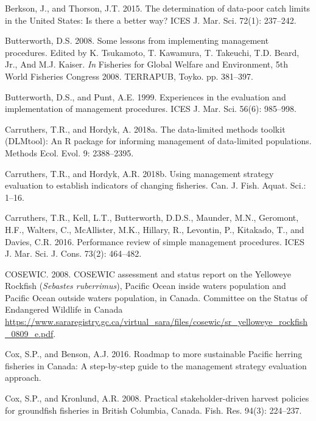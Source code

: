 \documentclass[11pt]{book}
\begin{document}
\leavevmode\hypertarget{ref-berkson2015}{}%
Berkson, J., and Thorson, J.T. 2015. The determination of data-poor catch limits in the United States: Is there a better way? ICES J. Mar. Sci. 72(1): 237--242.

\leavevmode\hypertarget{ref-butterworth2008}{}%
Butterworth, D.S. 2008. Some lessons from implementing management procedures. Edited by K. Tsukamoto, T. Kawamura, T. Takeuchi, T.D. Beard, Jr., And M.J. Kaiser. \emph{In} Fisheries for Global Welfare and Environment, 5th World Fisheries Congress 2008. TERRAPUB, Toyko. pp. 381--397.

\leavevmode\hypertarget{ref-butterworth1999}{}%
Butterworth, D.S., and Punt, A.E. 1999. Experiences in the evaluation and implementation of management procedures. ICES J. Mar. Sci. 56(6): 985--998.

\leavevmode\hypertarget{ref-carruthers2018}{}%
Carruthers, T.R., and Hordyk, A. 2018a. The data-limited methods toolkit (DLMtool): An R package for informing management of data-limited populations. Methods Ecol. Evol. 9: 2388--2395.

\leavevmode\hypertarget{ref-carruthers_hordyk_2018}{}%
Carruthers, T.R., and Hordyk, A.R. 2018b. Using management strategy evaluation to establish indicators of changing fisheries. Can. J. Fish. Aquat. Sci.: 1--16.

\leavevmode\hypertarget{ref-carruthers2016}{}%
Carruthers, T.R., Kell, L.T., Butterworth, D.D.S., Maunder, M.N., Geromont, H.F., Walters, C., McAllister, M.K., Hillary, R., Levontin, P., Kitakado, T., and Davies, C.R. 2016. Performance review of simple management procedures. ICES J. Mar. Sci. J. Cons. 73(2): 464--482.

\leavevmode\hypertarget{ref-cosewic2008}{}%
COSEWIC. 2008. COSEWIC assessment and status report on the Yelloweye Rockfish (\emph{Sebastes ruberrimus}), Pacific Ocean inside waters population and Pacific Ocean outside waters population, in Canada. Committee on the Status of Endangered Wildlife in Canada \url{https://www.sararegistry.gc.ca/virtual_sara/files/cosewic/sr_yelloweye_rockfish_0809_e.pdf}.

\leavevmode\hypertarget{ref-cox2016}{}%
Cox, S.P., and Benson, A.J. 2016. Roadmap to more sustainable Pacific herring fisheries in Canada: A step-by-step guide to the management strategy evaluation approach.

\leavevmode\hypertarget{ref-cox2008a}{}%
Cox, S.P., and Kronlund, A.R. 2008. Practical stakeholder-driven harvest policies for groundfish fisheries in British Columbia, Canada. Fish. Res. 94(3): 224--237.
\end{document}
